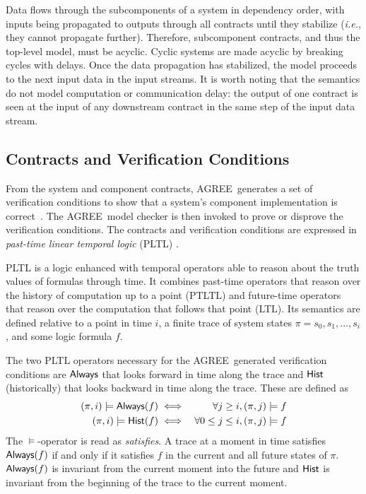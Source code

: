 \documentclass[global,twocolumn]{svjour}
\newcommand{\agr}{AGREE}
\newcommand{\ie}{\textit{i.e.}}
\begin{document}
Data flows through the subcomponents of a system in dependency order, with inputs being propagated to outputs through all contracts until they stabilize (\ie, they cannot propagate further).
%
Therefore, subcomponent contracts, and thus the top-level model, must be acyclic.
%
Cyclic systems are made acyclic by breaking cycles with delays.
%
Once the data propagation has stabilized, the model proceeds to the next input data in the input streams.
%
It is worth noting that the semantics do not model computation or communication delay: the output of one contract is seen at the input of any downstream contract in the same step of the input data stream.


\subsection{Contracts and Verification Conditions}

From the system and component contracts, \agr\ generates a set of verification conditions to show that a system's component implementation is correct~\cite{agree2013}.
%
The \agr\ model checker is then invoked to prove or disprove the verification conditions.
%
The contracts and verification conditions are expressed in \emph{past-time linear temporal logic} (PLTL) \cite{10.1093/jigpal/8.1.55}.

PLTL is a logic enhanced with temporal operators able to reason about the truth values of formulas through time.
%
It combines past-time operators that reason over the history of computation up to a point (PTLTL) and future-time operators that reason over the computation that follows that point (LTL).
%
Its semantics are defined relative to a point in time $i$, a finite trace of system states $\pi = s_0, s_1, \ldots, s_i$, and some logic formula $f$.

The two PLTL operators necessary for the \agr\ generated verification conditions are $\mathsf{Always}$ that looks forward in time along the trace and $\mathsf{Hist}$ (historically) that looks backward in time along the trace.
%
These are defined as
%
\begin{eqnarray*}
 (\pi, i) \models \mathsf{Always}(f) & \iff & \forall j \ge i, (\pi, j) \models f \\
(\pi, i) \models \mathsf{Hist}(f) & \iff & \forall 0 \le j \le i, (\pi, j) \models f
\end{eqnarray*}
%
The $\models$-operator is read as \emph{satisfies}.
%
A trace at a moment in time satisfies $\mathsf{Always}(f)$ if and only if it satisfies $f$ in the current and all future states of $\pi$.
%
$\mathsf{Always}(f)$ is invariant from the current moment into the future and $\mathsf{Hist}$ is invariant from the beginning of the trace to the current moment.
\end{document}
